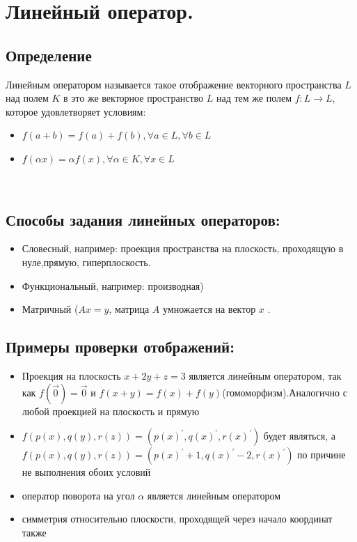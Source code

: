 \documentclass[12pt]{article}
\begin{document}
\section{Линейный оператор.}
\subsection{Определение}
Линейным оператором называется такое отображение векторного пространства $L$ над полем $K$ в это же векторное пространство $L$ над тем же полем $f: L \longrightarrow L $, которое удовлетворяет условиям:
\begin{itemize}
    \item $f(a+b)=f(a)+f(b), \forall a \in L, \forall b \in L$
    \item $f(\alpha x)=\alpha f(x), \forall \alpha \in K, \forall x \in L$
\end{itemize}
\\

\subsection{Способы задания линейных операторов:}
\begin{itemize}
    \item Словесный, например: проекция пространства на плоскость, проходящую в нуле,прямую, гиперплоскость.
    \item Функциональный, например: производная)
    \item Матричный ($Ax=y$, матрица $A$ умножается на вектор $x$  .
\end{itemize}
\subsection{Примеры проверки отображений:}
\begin{itemize}
    \item Проекция на плоскость $x+2y+z=3$ является линейным оператором, так как $f(\overrightarrow{0})= \overrightarrow{0}$ и $f(x+y)=f(x)+f(y)$(гомоморфизм).Аналогично с любой проекцией на плоскость и прямую
    \item $f(p(x),q(y),r(z))=(p(x)^{'},q(x)^{'},r(x)^{'})$ будет являться, а $f(p(x),q(y),r(z))=(p(x)^{'}+1,q(x)^{'}-2,r(x)^{'})$ по причине не выполнения обоих условий
    \item оператор поворота на угол $\alpha $ является линейным оператором
    \item симметрия относительно плоскости, проходящей через начало координат также
\end{itemize}
\end{document}

